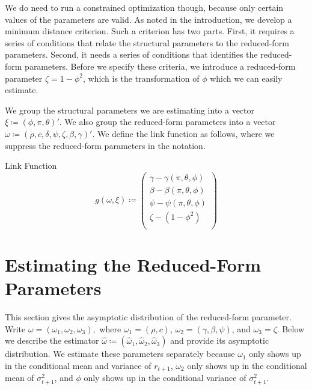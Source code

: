 \documentclass[11pt, letterpaper, twoside]{article}
\begin{document}
We do need to run a constrained optimization though, because only certain values of the parameters are valid. As noted in the introduction, we develop a minimum distance criterion. Such a criterion has two parts. First, it requires a series of conditions that relate the structural parameters to the reduced-form parameters.  Second, it needs a series of conditions that identifies the reduced-form parameters. Before we specify these criteria, we introduce a reduced-form parameter $\zeta = 1 - \phi^2$, which is the transformation of $\phi$ which we can easily estimate.

We group the structural parameters we are estimating into a vector $\xi \coloneqq (\phi, \pi, \theta)'$.
We also group the reduced-form parameters into a vector $\omega \coloneqq (\rho, c, \delta, \psi, \zeta, \beta, \gamma)'$.
We define the link function as follows, where we suppress the reduced-form parameters in the notation.


%
\begin{defn}{Link Function}
    \label{defn:link_function}
    \begin{equation}
        g(\omega, \xi) \coloneqq
%
        \begin{pmatrix}
            \gamma - \gamma(\pi, \theta, \phi) \\ 
            \beta - \beta(\pi, \theta, \phi) \\
            \psi - \psi(\pi, \theta, \phi)  \\
            \zeta - (1 - \phi^2)  \\
        \end{pmatrix}
%
\end{equation}

\end{defn}



\section{Estimating the Reduced-Form Parameters}\label{sec:EstimatingReducedForm}

This section gives the asymptotic distribution of the reduced-form parameter. Write $\omega =(\omega_{1},\omega_{2},\omega_{3}),$ where $\omega_{1}=(\rho ,c)$, $\omega_{2} = (\gamma, \beta, \psi)$, and $\omega_{3} = \zeta$. Below we describe the estimator $\widehat{\omega} \coloneqq (\widehat{\omega}_{1},\widehat{\omega}_{2},\widehat{\omega}_{3})$ and provide its asymptotic distribution. We estimate these parameters separately because $\omega_{1}$ only shows up in the conditional mean and variance of $r_{t+1}$, $\omega_{2}$ only shows up in the conditional mean of $\sigma_{t+1}^{2}$, and $\phi $ only shows up in the conditional variance of $\sigma_{t+1}^{2}.$ 
\end{document}
